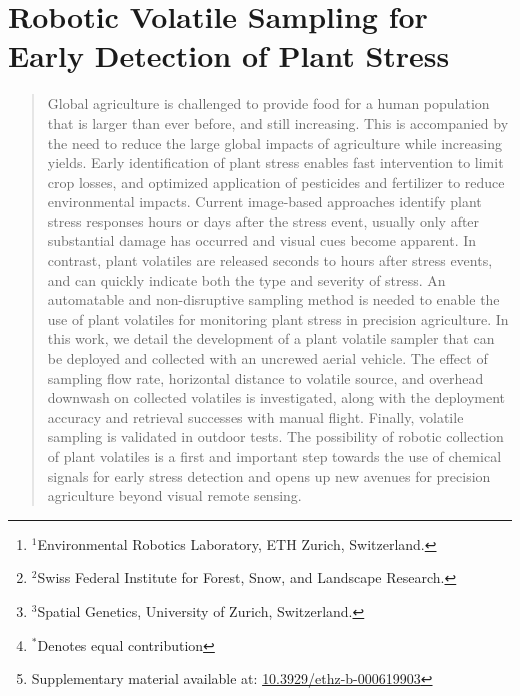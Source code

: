 \chapter{Robotic Volatile Sampling for Early Detection of Plant Stress}
\label{ch:VOL}


\author{Christian Geckeler$^{1,2,*}$, Sergio E. Ramos$^{3, *}$, Meredith C. Schuman$^{3}$, and Stefano Mintchev$^{1,2}$
\thanks{${}^{1}$Environmental Robotics Laboratory,
ETH Zurich, Switzerland.}%
\thanks{${}^{2}$Swiss Federal Institute for Forest, Snow, and Landscape Research.}
\thanks{${}^{3}$Spatial Genetics, University of Zurich, Switzerland.}%
\thanks{${}^{*}$Denotes equal contribution}
\thanks{Supplementary material available at: \href{https://doi.org/10.3929/ethz-b-000619903}{10.3929/ethz-b-000619903}}
}

\begin{abstract}
Global agriculture is challenged to provide food for a human population that is larger than ever before, and still increasing. This is accompanied by the need to reduce the large global impacts of agriculture while increasing yields. Early identification of plant stress enables fast intervention to limit crop losses, and optimized application of pesticides and fertilizer to reduce environmental impacts. Current image-based approaches identify plant stress responses hours or days after the stress event, usually only after substantial damage has occurred and visual cues become apparent. In contrast, plant volatiles are released seconds to hours after stress events, and can quickly indicate both the type and severity of stress. An automatable and non-disruptive sampling method is needed to enable the use of plant volatiles for monitoring plant stress in precision agriculture. In this work, we detail the development of a plant volatile sampler that can be deployed and collected with an uncrewed aerial vehicle. The effect of sampling flow rate, horizontal distance to volatile source, and overhead downwash on collected volatiles is investigated, along with the deployment accuracy and retrieval successes with manual flight. Finally, volatile sampling is validated in outdoor tests. The possibility of robotic collection of plant volatiles is a first and important step towards the use of chemical signals for early stress detection and opens up new avenues for precision agriculture beyond visual remote sensing.
\end{abstract}

